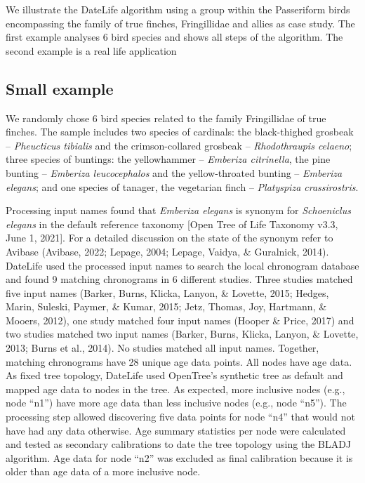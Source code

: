 \documentclass[
  english,
  man]{apa6}
\begin{document}
We illustrate the DateLife algorithm using a group within the Passeriform birds encompassing the family of true finches, Fringillidae and allies as case study. The first example analyses 6 bird species and shows all steps of the algorithm. The second example is a real life application

\hypertarget{small-example}{%
\subsection{Small example}\label{small-example}}

We randomly chose 6 bird species related to the family Fringillidae of true finches. The sample includes
two species of cardinals:
the black-thighed grosbeak -- \emph{Pheucticus tibialis} and
the crimson-collared grosbeak -- \emph{Rhodothraupis celaeno};
three species of buntings:
the yellowhammer -- \emph{Emberiza citrinella},
the pine bunting -- \emph{Emberiza leucocephalos} and
the yellow-throated bunting -- \emph{Emberiza elegans};
and one species of tanager, the vegetarian finch -- \emph{Platyspiza crassirostris}.

Processing input names found that \emph{Emberiza elegans} is synonym for \emph{Schoeniclus elegans} in the default reference taxonomy {[}Open Tree of Life Taxonomy v3.3, June 1, 2021{]}. For a detailed discussion on the state of the synonym refer to Avibase (Avibase, 2022; Lepage, 2004; Lepage, Vaidya, \& Guralnick, 2014).
DateLife used the processed input names to search the local chronogram database and found 9 matching chronograms in 6 different studies. Three studies matched five input names (Barker, Burns, Klicka, Lanyon, \& Lovette, 2015; Hedges, Marin, Suleski, Paymer, \& Kumar, 2015; Jetz, Thomas, Joy, Hartmann, \& Mooers, 2012), one study matched four input names (Hooper \& Price, 2017) and two studies matched two input names (Barker, Burns, Klicka, Lanyon, \& Lovette, 2013; Burns et al., 2014). No studies matched all input names. Together, matching chronograms have 28 unique age data points. All nodes have age data.
As fixed tree topology, DateLife used OpenTree's synthetic tree as default and mapped age data to nodes in the tree.
As expected, more inclusive nodes (e.g., node ``n1'') have more age data than less inclusive nodes (e.g., node ``n5'').
The processing step allowed discovering five data points for node ``n4'' that would not have had any data otherwise.
Age summary statistics per node were calculated and tested as secondary calibrations to date the tree topology using the BLADJ algorithm.
Age data for node ``n2'' was excluded as final calibration because it is older than age data of a more inclusive node.
\end{document}

